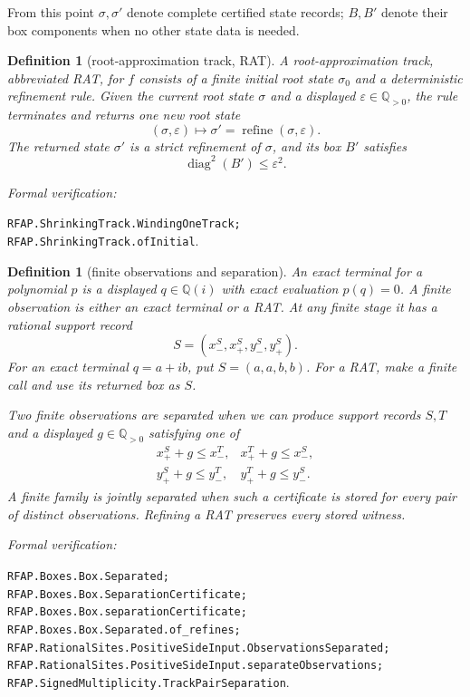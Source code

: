 \documentclass[11pt]{article}
\newtheorem{definition}[theorem]{Definition}
\newcommand{\Qi}{\mathbb{Q}(i)}
\newcommand{\Q}{\mathbb{Q}}
\newcommand{\diamq}{\operatorname{diag}^{2}}
\newcommand{\eps}{\varepsilon}
\newcommand{\leanref}[1]{\par\smallskip\noindent
  \emph{Formal verification:}\par\nobreak
  {\raggedright\nolinkurl{#1}.\par}}
\begin{document}
From this point $\sigma,\sigma'$ denote complete certified state records;
$B,B'$ denote their box components when no other state data is needed.

\begin{definition}[root-approximation track, RAT]
\label{def:rat}
A \emph{root-approximation track}, abbreviated \emph{RAT}, for $f$ consists
of a finite initial root state $\sigma_0$ and a deterministic refinement rule.
Given the current root state $\sigma$ and a displayed $\eps\in\Q_{>0}$, the rule
terminates and returns one new root state
\[
                    (\sigma,\eps)\longmapsto
                    \sigma'=\operatorname{refine}(\sigma,\eps).
\]
The returned state $\sigma'$ is a strict refinement of $\sigma$, and its box $B'$
satisfies
\[
                  \diamq(B')\le\eps^2.
\]
\end{definition}

\leanref{RFAP.ShrinkingTrack.WindingOneTrack;
RFAP.ShrinkingTrack.ofInitial}

\begin{definition}[finite observations and separation]
\label{def:finite-observation-separation}
An \emph{exact terminal} for a polynomial $p$ is a displayed $q\in\Qi$
with exact evaluation $p(q)=0$.  A \emph{finite observation}
is either an exact terminal or a RAT.  At any finite stage it has a rational
\emph{support record}
\[
                   S=(x_-^S,x_+^S,y_-^S,y_+^S).
\]
For an exact terminal $q=a+ib$, put $S=(a,a,b,b)$.  For a RAT, make a
finite call and use its returned box as $S$.

Two finite observations are \emph{separated} when we can produce support
records $S,T$ and a displayed $g\in\Q_{>0}$ satisfying one of
\[
\begin{array}{ll}
 x_+^S+g\le x_-^T, & x_+^T+g\le x_-^S,\\[2pt]
 y_+^S+g\le y_-^T, & y_+^T+g\le y_-^S.
\end{array}
\]
A finite family is \emph{jointly separated} when such a certificate is
stored for every pair of distinct observations.  Refining a RAT preserves
every stored witness.
\end{definition}

\leanref{RFAP.Boxes.Box.Separated;
RFAP.Boxes.Box.SeparationCertificate;
RFAP.Boxes.Box.separationCertificate;
RFAP.Boxes.Box.Separated.of_refines;
RFAP.RationalSites.PositiveSideInput.ObservationsSeparated;
RFAP.RationalSites.PositiveSideInput.separateObservations;
RFAP.SignedMultiplicity.TrackPairSeparation}
\end{document}
